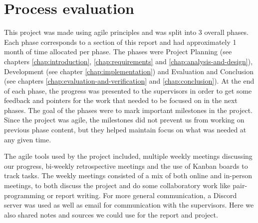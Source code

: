 \section{Process evaluation}
\label{sec:process-evaluation}

This project was made using agile principles and was split into 3 overall phases. Each phase corresponds to a section of
this report and had approximately 1 month of time allocated per phase. The phases were Project Planning 
(see chapters \ref{chap:introduction}, \ref{chap:requirements} and \ref{chap:analysis-and-design}), Development 
(see chapter \ref{chap:implementation}) and Evaluation and Conclusion (see chapters \ref{chap:evaluation-and-verification} 
and \ref{chap:conclusion}). At the end of each phase, the progress was presented to the supervisors in order to get some 
feedback and pointers for the work that needed to be focused on in the next phases. The goal of the phases were to mark 
important milestones in the project. Since the project was agile, the milestones did not prevent us from working on 
previous phase content, but they helped maintain focus on what was needed at any given time.

The agile tools used by the project included, multiple weekly meetings discussing our progress, bi-weekly retrospective 
meetings and the use of Kanban boards to track tasks. The weekly meetings consisted of a mix of both online and in-person
meetings, to both discuss the project and do some collaboratory work like pair-programming or report writing. For more 
general communication, a Discord server was used as well as email for communication with the supervisors. Here we also 
shared notes and sources we could use for the report and project.


